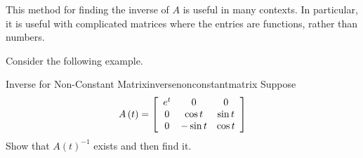 %
%
%

This method for finding the inverse of $A$ is useful in many contexts. In particular, it 
is useful with complicated matrices where the entries are functions, rather than numbers.

Consider the following example. 

\begin{example}{Inverse for Non-Constant Matrix}{inversenonconstantmatrix}
Suppose
\begin{equation*}
A\left( t\right) =\left[
\begin{array}{ccc}
e^{t} & 0 & 0 \\
0 & \cos t & \sin t \\
0 & -\sin t & \cos t
\end{array}
\right]
\end{equation*}
Show that $A\left( t\right) ^{-1}$ exists and then find it.
\end{example}

